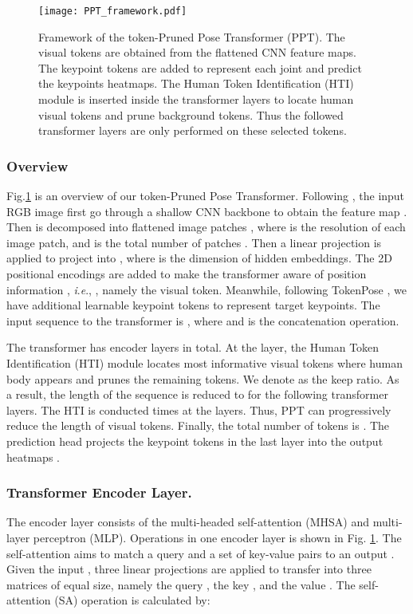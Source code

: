 \documentclass[runningheads]{llncs}
\newcommand{\ie}{\textit{i}.\textit{e}., }
\begin{document}
\begin{figure}[!t]
    \centering
    \texttt{[image: PPT\_framework.pdf]}
    \caption{\small{Framework of the token-Pruned Pose Transformer (PPT). 
    The visual tokens are obtained from the flattened CNN feature maps. The keypoint tokens are added to represent each joint and predict the keypoints heatmaps. The Human Token Identification (HTI) module is inserted inside the transformer layers to locate human visual tokens and prune background tokens. Thus the followed transformer layers are only performed on these selected tokens. }  }
    \label{fig:2D_prune_framework}
\end{figure}


\subsubsection{Overview}
Fig.\ref{fig:2D_prune_framework} is an overview of our token-Pruned Pose Transformer. 
Following \cite{li2021tokenpose}, the input RGB image  first go through a shallow CNN backbone  to obtain the feature map .
Then  is decomposed into flattened image patches , where  is the resolution of each image patch, and  is the total number of patches \cite{dosovitskiy2020image}. Then a linear projection is applied to project  into , where  is the dimension of hidden embeddings.
The 2D positional encodings  are added to make the transformer aware of position information \cite{vaswani2017attention}, \ie  , namely the visual token.
Meanwhile, following TokenPose \cite{li2021tokenpose}, we have  additional learnable keypoint tokens  to represent  target keypoints. 
The input sequence to the transformer is , where  and  is the concatenation operation.   

The transformer has  encoder layers in total. 
At the  layer, the Human Token Identification (HTI) module locates  most informative visual tokens where human body appears and prunes the remaining tokens. 
We denote  as the keep ratio.
As a result, the length of the sequence is reduced to  for the following transformer layers.  
The HTI is conducted  times at the  layers. 
Thus, PPT can progressively reduce the length of visual tokens. 
Finally, the total number of tokens is . 
The prediction head projects the keypoint tokens in the last layer  into the output heatmaps . 
\subsubsection{Transformer Encoder Layer. }
The encoder layer consists of the multi-headed self-attention (MHSA) and multi-layer perceptron (MLP). Operations in one encoder layer is shown in Fig. \ref{fig:2D_prune_framework}.
The self-attention  aims to match a query and a set of key-value pairs to an output \cite{vaswani2017attention}. 
Given the input , three linear projections are applied to transfer  into three matrices of equal size, namely the query , the key , and the value .  
 The self-attention (SA) operation is calculated by:
\end{document}
